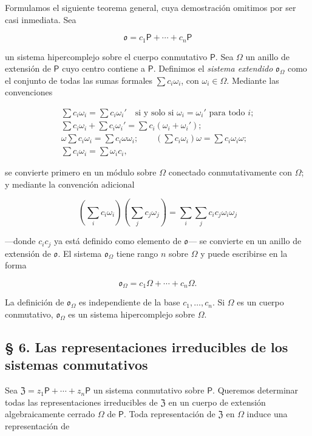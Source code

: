 Formulamos el siguiente teorema general, cuya demostración omitimos por ser casi inmediata. Sea

\[
\mathfrak{o}=c_1\mathsf P+\cdots+c_n\mathsf P
\]

un sistema hipercomplejo sobre el cuerpo conmutativo $\mathsf P$. Sea $\Omega$ un anillo de extensión de $\mathsf P$ cuyo centro contiene a $\mathsf P$. Definimos el \emph{sistema extendido} $\mathfrak{o}_\Omega$ como el conjunto de todas las sumas formales $\sum c_i\omega_i$, con $\omega_i\in\Omega$. Mediante las convenciones

\[
\begin{array}{l}
\sum c_i\omega_i=\sum c_i\omega_i'\quad\text{si y solo si }\omega_i=\omega_i'\text{ para todo }i;\\
\sum c_i\omega_i+\sum c_i\omega_i'=\sum c_i(\omega_i+\omega_i');\\
\omega\sum c_i\omega_i=\sum c_i\omega\omega_i;\qquad
\left(\sum c_i\omega_i\right)\omega=\sum c_i\omega_i\omega;\\
\sum c_i\omega_i=\sum\omega_i c_i,
\end{array}
\]

se convierte primero en un módulo sobre $\Omega$ conectado conmutativamente con $\Omega$; y mediante la convención adicional

\[
\left(\sum_i c_i\omega_i\right)\left(\sum_j c_j\omega_j\right)
=\sum_i\sum_j c_ic_j\omega_i\omega_j
\]

---donde $c_ic_j$ ya está definido como elemento de $\mathfrak{o}$--- se convierte en un anillo de extensión de $\mathfrak{o}$. El sistema $\mathfrak{o}_\Omega$ tiene rango $n$ sobre $\Omega$ y puede escribirse en la forma

\[
\mathfrak{o}_\Omega=c_1\Omega+\cdots+c_n\Omega.
\]

La definición de $\mathfrak{o}_\Omega$ es independiente de la base $c_1,\ldots,c_n$. Si $\Omega$ es un cuerpo conmutativo, $\mathfrak{o}_\Omega$ es un sistema hipercomplejo sobre $\Omega$.

\subsection*{§ 6. Las representaciones irreducibles de los sistemas conmutativos}

Sea $\mathfrak Z=z_1\mathsf P+\cdots+z_n\mathsf P$ un sistema conmutativo sobre $\mathsf P$. Queremos determinar todas las representaciones irreducibles de $\mathfrak Z$ en un cuerpo de extensión algebraicamente cerrado $\Omega$ de $\mathsf P$. Toda representación de $\mathfrak Z$ en $\Omega$ induce una representación de

